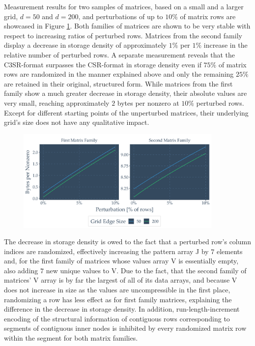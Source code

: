    Measurement results for two samples of matrices, based on a small and a larger grid, $d = 50$ and $d = 200$, and
    perturbations of up to $10\%$ of matrix rows are showcased in Figure \ref{fig:bytespernnz-perturbed}. Both families
    of matrices are shown to be very stable with respect to increasing ratios of perturbed rows. Matrices from the
    second family display a decrease in storage density of approximately $1\%$ per $1\%$ increase in the relative number
    of perturbed rows. A separate measurement reveals that the C3SR-format surpasses the CSR-format in storage density
    even if $75\%$ of matrix rows are randomized in the manner explained above and only the remaining $25\%$ are
    retained in their original, structured form. While matrices from the first family show a much greater decrease in
    storage density, their absolute values are very small, reaching approximately $2$ bytes per nonzero at $10\%$
    perturbed rows.  Except for different starting points of the unperturbed matrices, their underlying grid's size does
    not have any qualitative impact.

    \begin{figure}[H]
      \centering
      \captionsetup{width=0.9\textwidth}
      \includegraphics[width=0.9\textwidth]{assets/bytespernnz-perturbed}
      \label{fig:bytespernnz-perturbed}
    \end{figure}

    The decrease in storage density is owed to the fact that a perturbed row's column indices are randomized,
    effectively increasing the pattern array J by $7$ elements and, for the first family of matrices whose values array
    V is essentially empty, also adding $7$ new unique values to V. Due to the fact, that the second family of matrices'
    V array is by far the largest of all of its data arrays, and because V does not increase in size as the values are
    uncompressible in the first place, randomizing a row has less effect as for first family matrices, explaining the
    difference in the decrease in storage density. In addition, run-length-increment encoding of the structural
    information of contiguous rows corresponding to segments of contiguous inner nodes is inhibited by every randomized
    matrix row within the segment for both matrix families.

